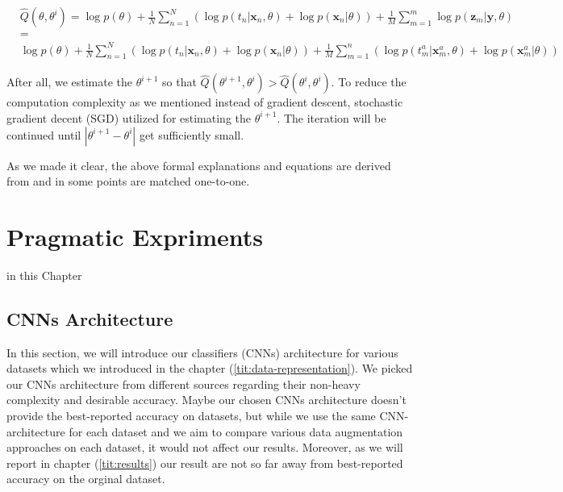 \begin{equation}
  \begin{aligned}
     & \hat{Q}\left(\theta, \theta^{i}\right)=\log p(\theta)+\frac{1}{N} \sum_{n=1}^{N}\left(\log p\left(t_{n} | \mathbf{x}_{n}, \theta\right)+\log p\left(\mathbf{x}_{n} | \theta\right)\right)+\frac{1}{M} \sum_{m=1}^{m} \log p\left(\mathbf{z}_{m} | \mathbf{y}, \theta\right) \\
     & =                                                                                                                                                                                                                                                                           \\
     & \log p(\theta)+\frac{1}{N} \sum_{n=1}^{N}\left(\log p\left(t_{n} | \mathbf{x}_{n}, \theta\right)+\log p\left(\mathbf{x}_{n} | \theta\right)\right)+\frac{1}{M}
    \sum_{m=1}^{n}\left(\log p\left(t_{m}^{a} | \mathbf{x}_{m}^{a}, \theta\right)+\log p\left(\mathbf{x}_{m}^{a} | \theta\right)\right)
  \end{aligned}
\end{equation}

After all, we estimate the $\theta^{i +1}$ so that $\hat{Q}(\theta^{i +1}, \theta^{i}) >
\hat{Q}(\theta^{i}, \theta^{i})$. To reduce the computation complexity as we mentioned instead of
gradient descent, stochastic gradient decent (SGD) utilized for estimating the $\theta^{i +1}$. The
iteration will be continued until $|\theta^{i +1} - \theta^{i}|$ get sufficiently small. 

As we made it clear, the above formal explanations and equations are derived from \cite{refrence_bayesian_approach} and in some points are matched one-to-one.  


\chapter{Pragmatic Expriments}
in this Chapter 

\section{CNNs Architecture}
In this section, we will introduce our classifiers (CNNs) architecture for various datasets which we
introduced in the chapter (\ref{tit:data-representation}). We picked our CNNs architecture from
different sources regarding their non-heavy complexity and desirable accuracy.  Maybe our chosen
CNNs architecture doesn't provide the best-reported accuracy on datasets, but while we use the
same CNN-architecture for each dataset and we aim to compare various data augmentation approaches on
each dataset, it would not affect our results. Moreover, as we will report in chapter (\ref{tit:results})
our result are not so far away from best-reported accuracy on the orginal dataset.

